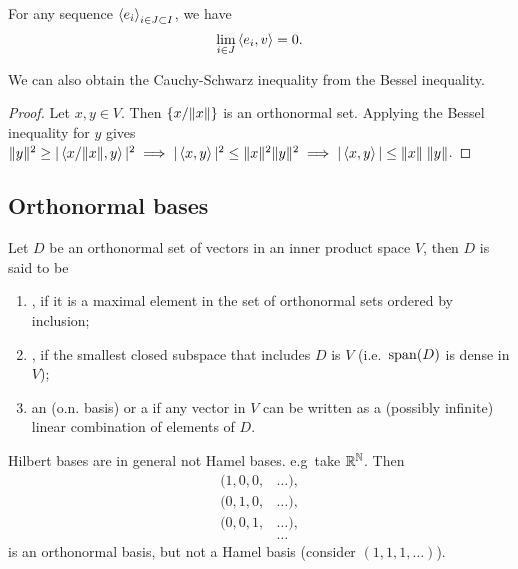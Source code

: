 \begin{corollary} \label{RiemannLebesgueLemma}
For any sequence $\left\langle e_i \right\rangle_{i\in J \subset I}$, we have
\[ \lim_{i\in J} \left\langle e_i,v \right\rangle = 0. \]
\end{corollary}

\begin{corollary}
We can also obtain the Cauchy-Schwarz inequality from the Bessel inequality.
\end{corollary}
\begin{proof}
Let $x,y\in V$. Then $\{x/\lVert x\rVert\}$ is an orthonormal set. Applying the Bessel inequality for $y$ gives $\lVert y\rVert^2 \geq |\left\langle x/\lVert x\rVert, y \right\rangle|^2 \implies |\left\langle x,y \right\rangle|^2\leq \lVert x\rVert^2\lVert y\rVert^2 \implies |\left\langle x,y \right\rangle| \leq \lVert x\rVert\;\lVert y\rVert$.
\end{proof}

\subsection{Orthonormal bases}
\begin{definition}
Let $D$ be an orthonormal set of vectors in an inner product space $V$, then $D$ is said to be
\begin{enumerate}
\item {}, if it is a maximal element in the set of orthonormal sets ordered by inclusion;
\item {}, if the smallest closed subspace that includes $D$ is $V$ (i.e.\ $\operatorname{span}(D)$ is dense in $V$);
\item an  (o.n. basis) or a  if any vector in $V$ can be written as a (possibly infinite) linear combination of elements of $D$.
\end{enumerate}
\end{definition}
\begin{note}
Hilbert bases are in general not Hamel bases.  e.g\, take $\mathbb{R}^\mathbb{N}$. Then 
\begin{align*}
(1,0,0,&\ldots), \\
(0,1,0,&\ldots), \\
(0,0,1,&\ldots), \\
&\ldots
\end{align*}
is an orthonormal basis, but not a Hamel basis (consider $(1,1,1,\ldots)$).
\end{note}

